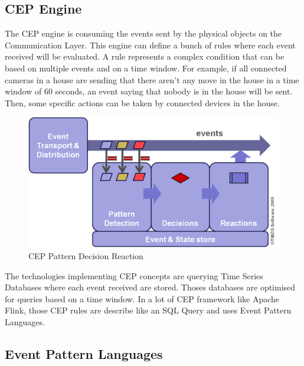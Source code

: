\documentclass[11pt]{article}
\begin{document}
\subsection{CEP Engine}

The CEP engine is consuming the events sent by the physical objects on the Communication Layer. This engine can define a bunch of rules where each event received will be evaluated. A rule represents a complex condition that can be based on multiple events and on a time window. For example, if all connected cameras in a house are sending that there aren't any move in the house in a time window of 60 seconds, an event saying that nobody is in the house will be sent. Then, some specific actions can be taken by connected devices in the house. 
\newline
\begin{figure}[h]
	\includegraphics[scale=0.6]{assets/cep-pattern-decision-reaction.png} 
	\caption{CEP Pattern Decision Reaction}
	\label{fig:cep-pattern-decision-reaction}
\end{figure}

The technologies implementing CEP concepts are querying Time Series Databases where each event received are stored. Thoses databases are optimised for queries based on a time window. In a lot of CEP framework like Apache Flink, those CEP rules are describe like an SQL Query and uses Event Pattern Languages. 

\subsection{Event Pattern Languages}
\end{document}
